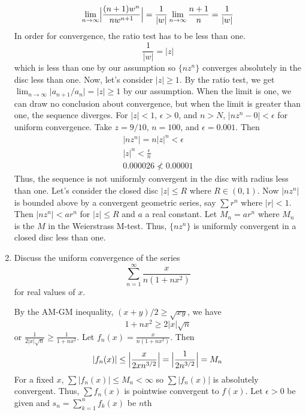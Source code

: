 \begin{enumerate}
\[  \lim_{n\to\infty}\Bigl\lvert\frac{(n + 1)w^n}{nw^{n + 1}}\Bigr\rvert =
  \frac{1}{\lvert w\rvert}\lim_{n\to\infty}\frac{n + 1}{n} =
  \frac{1}{\lvert w\rvert}
  \]
  In order for convergence, the ratio test has to be less than one.
  \[
  \frac{1}{\lvert w\rvert} = \lvert z\rvert
  \]
  which is less than one by our assumption so \(\{nz^n\}\) converges
  absolutely in the disc less than one.
  Now, let's consider \(\lvert z\rvert\geq 1\).
  By the ratio test, we get
  \(\lim_{n\to\infty}\lvert a_{n + 1}/a_n\rvert = \lvert z\rvert\geq 1\) by our
  assumption.
  When the limit is one, we can draw no conclusion about convergence, but when
  the limit is greater than one, the sequence diverges.
  For \(\lvert z\rvert < 1\), \(\epsilon > 0\), and \(n > N\),
  \(\lvert nz^n - 0\rvert < \epsilon\) for uniform convergence.
  Take \(z = 9/10\), \(n = 100\), and \(\epsilon = 0.001\).
  Then
  \begin{gather*}
    \lvert nz^n\rvert = n\lvert z\rvert^n < \epsilon\\
    \lvert z\rvert^n < \frac{\epsilon}{n}\\
    0.000026 \not < 0.00001
  \end{gather*}
  Thus, the sequence is not uniformly convergent in the disc with radius less
  than one.
  Let's consider the closed disc \(\lvert z\rvert\leq R\) where \(R\in(0,1)\).
  Now \(\lvert nz^n\rvert\) is bounded above by a convergent geometric series,
  say \(\sum r^n\) where \(\lvert r\rvert < 1\).
  Then \(\lvert nz^n\rvert < ar^n\) for \(\lvert z\rvert\leq R\) and \(a\) a
  real constant.
  Let \(M_n = ar^n\) where \(M_n\) is the \(M\) in the Weierstrass M-test.
  Thus, \(\{nz^n\}\) is uniformly convergent in a closed disc less than one.
\item
  Discuss the uniform convergence of the series
  \[
  \sum_{n = 1}^{\infty}\frac{x}{n(1 + nx^2)}
  \]
  for real values of \(x\).
  \par\smallskip
  By the AM-GM inequality, \((x + y)/2\geq \sqrt{xy}\), we have
  \[
  1 + nx^2\geq 2\lvert x\rvert\sqrt{n}
  \]
  or \(\frac{1}{2\lvert x\rvert\sqrt{n}}\geq\frac{1}{1 + nx^2}\).
  Let \(f_n(x) = \frac{x}{n(1 + nx^2)}\).
  Then
  \[
  \lvert f_n(x)\rvert\leq \Bigl\lvert\frac{x}{2xn^{3/2}}\Bigr\rvert =
  \Bigl\lvert\frac{1}{2n^{3/2}}\Bigr\rvert = M_n
  \]
  For a fixed \(x\), \(\sum\lvert f_n(x)\rvert\leq M_n < \infty\) so
  \(\sum\lvert f_n(x)\rvert\) is absolutely convergent.
  Thus, \(\sum f_n(x)\) is pointwise convergent to \(f(x)\).
  Let \(\epsilon > 0\) be given and \(s_n = \sum_{k = 1}^nf_k(x)\) be \(n\)th

\end{enumerate}
